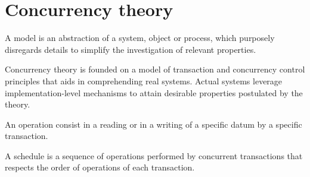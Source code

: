 \section{Concurrency theory}

\begin{definition}
    A model is an abstraction of a system, object or process, which purposely disregards details to simplify the investigation of relevant properties. 
\end{definition}
Concurrency theory is founded on a model of transaction and concurrency control principles that aids in comprehending real systems.
Actual systems leverage implementation-level mechanisms to attain desirable properties postulated by the theory.
\begin{definition}
    An operation consist in a reading or in a writing of a specific datum by a specific transaction. 
\end{definition}
\begin{definition}
    A schedule is a sequence of operations performed by concurrent transactions that respects the order of operations of each transaction. 
\end{definition}

